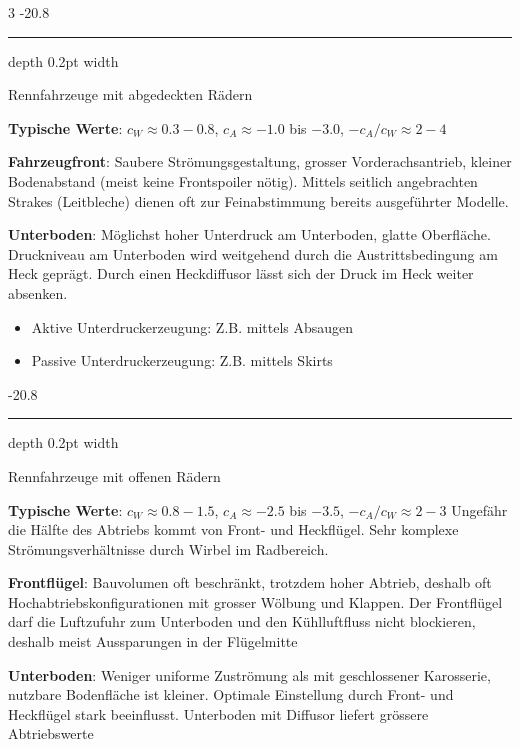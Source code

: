 \documentclass[8pt, landscape, fleqn]{scrartcl}
\makeatletter
\renewcommand{\subsubsection}{\@startsection{subsubsection}{1}{0mm}%
{-2\baselineskip}{0.8\baselineskip}%
{\hrule depth 0.2pt width\columnwidth\vspace*{1.2em}\normalsize\bfseries\rmfamily}}
\makeatother
\begin{document}
\begin{multicols*}{3}
\subsubsection{Rennfahrzeuge mit abgedeckten Rädern}

\textbf{Typische Werte}: $c_W \approx 0.3 - 0.8$, $c_A \approx -1.0$ bis $-3.0$, $-c_A/c_W \approx 2 - 4$ \newline \newline

\textbf{Fahrzeugfront}: Saubere Strömungsgestaltung, grosser Vorderachsantrieb, kleiner Bodenabstand (meist keine Frontspoiler nötig). Mittels seitlich angebrachten 
Strakes (Leitbleche) dienen oft zur Feinabstimmung bereits ausgeführter Modelle. \newline \newline

\textbf{Unterboden}: Möglichst hoher Unterdruck am Unterboden, glatte Oberfläche. Druckniveau am Unterboden wird weitgehend durch die Austrittsbedingung am Heck geprägt. 
Durch einen Heckdiffusor lässt sich der Druck im Heck weiter absenken.

\begin{itemize}
    \item Aktive Unterdruckerzeugung: Z.B. mittels Absaugen
    \item Passive Unterdruckerzeugung: Z.B. mittels Skirts 
\end{itemize}

\subsubsection{Rennfahrzeuge mit offenen Rädern}

\textbf{Typische Werte}: $c_W \approx 0.8-1.5$, $c_A \approx -2.5$ bis $-3.5$, $-c_A/c_W \approx 2 - 3$ 
Ungefähr die Hälfte des Abtriebs kommt von Front- und Heckflügel. Sehr komplexe Strömungsverhältnisse durch Wirbel im Radbereich.\newline \newline

\textbf{Frontflügel}: Bauvolumen oft beschränkt, trotzdem hoher Abtrieb, deshalb oft Hochabtriebskonfigurationen mit grosser Wölbung und Klappen. Der Frontflügel darf die Luftzufuhr zum Unterboden
und den Kühlluftfluss nicht blockieren, deshalb meist Aussparungen in der Flügelmitte \newline \newline

\textbf{Unterboden}: Weniger uniforme Zuströmung als mit geschlossener Karosserie, nutzbare Bodenfläche ist kleiner. Optimale Einstellung durch Front- und Heckflügel stark 
beeinflusst. Unterboden mit Diffusor liefert grössere Abtriebswerte


\end{multicols*}
\end{document}
